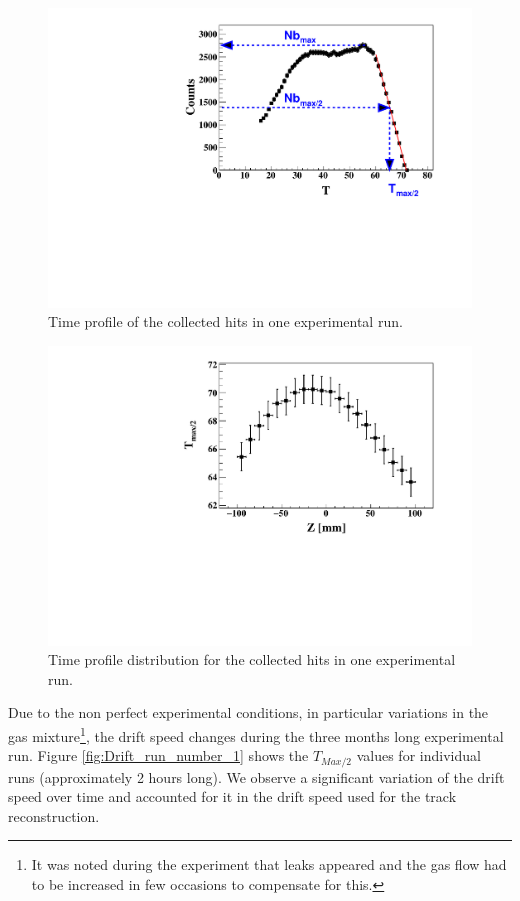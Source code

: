 \documentclass[twocolumn,showpacs,superscriptaddress,groupedaddress]{revtex4}
\begin{document}
\begin{figure}[tb]
   \centering
   \includegraphics[scale=0.42]{fig_2017/hits_time_profile.pdf}
   \caption[]{Time profile of the collected hits in one experimental run.  } 
   \label{fig:TDC_profile}
\end{figure}

\begin{figure}[tb]
\centering
\includegraphics[scale=0.42]{fig_2017/RunNumber_61452_TDCmax_Zslice.pdf}
\caption{Time profile distribution for the collected hits in one experimental 
run. } \label{fig:RunNumber_61551_TDCmax_Zslice}
\end{figure}

Due to the non perfect experimental conditions, in particular variations in the 
gas mixture\footnote{It was noted during the experiment that leaks appeared
and the gas flow had to be increased in few occasions to compensate for this.}, 
the drift speed changes during the three months long experimental run.  
Figure \ref{fig:Drift_run_number_1} shows the $T_{Max/2}$ values for 
individual runs (approximately 2 hours long). We observe a significant 
variation of the drift speed over time and accounted for it in the drift 
speed used for the track reconstruction. 
\end{document}

